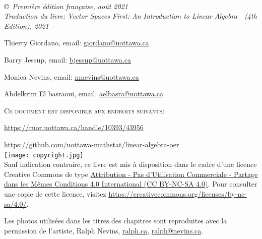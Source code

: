 \documentclass[11pt,french]{book} %
\begin{document}

\newpage
~\vfill
\thispagestyle{empty}



\vspace*{1in}

\noindent \copyright\ \textit{Premi\`ere \'edition fran\c{c}aise, août 2021}\\
\textit{Traduction du livre: \og Vector Spaces First: An Introduction to Linear Algebra\ \fg\ (4th Edition), 2021}


\smallskip
Thierry Giordano, email:
\href{mailto:giordano@uottawa.ca}{giordano@uottawa.ca}



\smallskip
Barry Jessup, email:
\href{mailto:bjessup@uottawa.ca}{bjessup@uottawa.ca}


\smallskip

Monica Nevins, email:
\href{mailto:mnevins@uottawa.ca}{mnevins@uottawa.ca}

\smallskip
Abdelkrim El basraoui, email:
\href{mailto:aelbasra@uottawa.ca}{aelbasra@uottawa.ca}

\smallskip

\noindent \textsc{Ce document est disponible aux endroits suivants:}

\href{https://ruor.uottawa.ca/handle/10393/43956}{https://ruor.uottawa.ca/handle/10393/43956}

\href{https://github.com/uottawa-mathstat/linear-algebra-oer}{https://github.com/uottawa-mathstat/linear-algebra-oer}  \\

%


\noindent \texttt{[image: copyright.jpg]}\\ %



\noindent Sauf indication contraire, ce livre est mis à disposition dans le cadre d'une licence Creative Commons de type \href{https://creativecommons.org/licenses/by-nc-sa/4.0/}{Attribution - Pas d’Utilisation Commerciale - Partage dans les Mêmes Conditions 4.0 International (CC BY-NC-SA 4.0)}.  Pour consulter une copie de cette licence, visitez \url{https://creativecommons.org/licenses/by-nc-sa/4.0/}.

Les photos utilisées dans les titres des chapitres sont reproduites avec la permission de l'artiste, Ralph Nevins, \url{ralph.ca}, \href{mailto:ralph@nevins.ca}{ralph@nevins.ca}.
\end{document}
